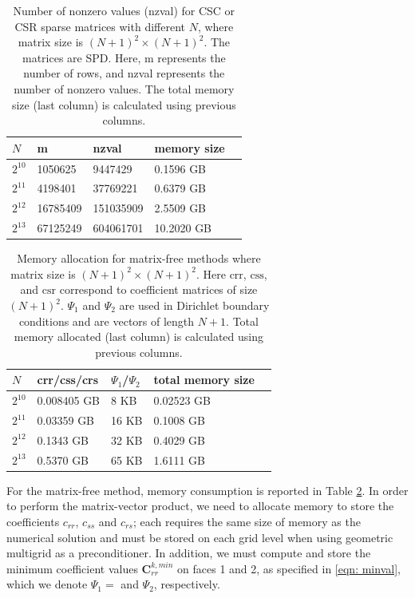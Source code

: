 \begin{table}[t]
\small\sf\centering
\begin{center}
\begin{tabular}{l l l l l }
\toprule
$N$  & m & nzval & memory size \\
\midrule
$2^{10}$& 1050625  & 9447429 & 0.1596 GB \\
$2^{11}$ & 4198401 & 37769221& 0.6379 GB &  \\
$2^{12}$ & 16785409   & 151035909   & 2.5509 GB &  \\
$2^{13}$ & 67125249   & 604061701   & 10.2020 GB & \\
\bottomrule
\end{tabular}
\end{center}
\caption{Number of nonzero values (nzval) for CSC or CSR sparse matrices with different $N$, where matrix size is $(N+1)^2 \times (N+1)^2$. The matrices are SPD. Here, m represents the number of rows, and nzval represents the number of nonzero values. The total memory size (last column) is calculated using previous columns.
}
\label{tab:memalloc_comparison}
\end{table}


\begin{table}[t!]
\small\sf\centering
\begin{center}
\begin{tabular}{l l l l l }
\toprule
$N$  & crr/css/crs & $\Psi_1$/$\Psi_2$ & total memory size \\
\midrule
$2^{10}$& 0.008405 GB  & 8 KB & 0.02523 GB \\
$2^{11}$ & 0.03359 GB & 16 KB &  0.1008 GB \\
$2^{12}$ & 0.1343 GB  & 32 KB  & 0.4029 GB &  \\
$2^{13}$ & 0.5370 GB   & 65 KB   & 1.6111 GB & \\
\bottomrule
\end{tabular}
\end{center}
\caption{Memory allocation for matrix-free methods where matrix size is $(N+1)^2 \times (N+1)^2$. Here $\mathrm{crr}$, $\mathrm{css}$, and $\mathrm{csr}$ correspond to coefficient matrices of size $(N+1)^2$. $\Psi_1$ and $\Psi_2$ are used in Dirichlet boundary conditions and are vectors of length $N+1$. Total memory allocated (last column) is calculated using previous columns.
}
\label{tab:memalloc_mf}
\end{table}

For the matrix-free method, memory consumption is reported in Table \ref{tab:memalloc_mf}. 
In order to perform the matrix-vector product, we need to allocate memory to store the coefficients $c_{rr}$, $c_{ss}$ and $c_{rs}$; each requires the same size of memory as the numerical solution and must be stored on each grid level when using geometric multigrid as a preconditioner. 
In addition, we must compute and store the minimum coefficient values ${\boldsymbol{C}}_{rr}^{k, min}$ on faces 1 and 2, as specified in \eqref{eqn: minval}, which we denote $\Psi_1 = $ and $\Psi_2$, respectively. 


